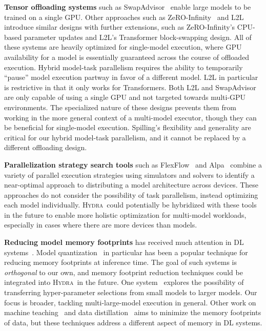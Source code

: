 \documentclass{article}
\newcommand{\system}{\textsc{Hydra}}
\begin{document}
{{\textbf{Tensor offloading systems} such as SwapAdvisor~\cite{huang2020swapadvisor,meng2017training} enable large models to be trained on a single GPU. Other approaches such as ZeRO-Infinity~\cite{zeroInfinity} and L2L~\cite{l2l} introduce similar designs with further extensions, such as ZeRO-Infinity's CPU-based parameter updates and L2L's Transformer block-swapping design. All of these systems are heavily optimized for single-model execution, where GPU availability for a model is essentially guaranteed across the course of offloaded execution. Hybrid model-task parallelism requires the ability to temporarily ``pause'' model execution partway in favor of a different model. L2L in particular is restrictive in that it only works for Transformers. Both L2L and SwapAdvisor are only capable of using a single GPU and not targeted towards multi-GPU environments. The specialized nature of these designs prevents them from working in the more general context of a multi-model executor, though they can be beneficial for single-model execution. Spilling's flexibility and generality are critical for our hybrid model-task parallelism, and it cannot be replaced by a different offloading design.

\textbf{Parallelization strategy search tools} such as FlexFlow~\cite{flexflow} and Alpa~\cite{alpa} combine a variety of parallel execution strategies using simulators and solvers to identify a near-optimal approach to distributing a model architecture across devices. These approaches do not consider the possibility of task parallelism, instead optimizing each model individually. \system~could potentially be hybridized with these tools in the future to enable more holistic optimization for multi-model workloads, especially in cases where there are more devices than models.

\textbf{Reducing model memory footprints} has received much attention in DL 
systems~\cite{chen2016training, gruslys2016memoryefficient, Kumar:EfficientRematerialization, Jain:Checkmate, TASO}. Model quantization~\cite{jacob2017quantization} in particular has been a popular technique for reducing memory footprints at inference time.
The goal of such systems is \textit{orthogonal} to our own, and memory footprint reduction techniques could be integrated into \system~in the future. One system~\cite{hyptransfer} explores the possibility of transferring hyper-parameter selections from small models to larger models. Our focus is broader, tackling multi-large-model execution in general. Other work on machine teaching~\cite{wang2021gradient} and data distillation~\cite{distillation} aims to minimize the memory footprints of data, but these techniques address a different aspect of memory in DL systems. 

}}
\end{document}
